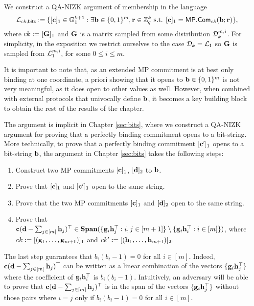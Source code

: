 We construct a QA-NIZK argument of membership in the language
$$
\mathcal{L}_{ck,\mathsf{bits}} := \{[\mathbf{c}]_1\in\mathbb{G}_1^{k+1} : \exists \mathbf{b}\in\{0,1\}^m,\mathbf{r}\in\mathbb{Z}_q^k \text{ s.t. } [\mathbf{c}]_1 = \mathsf{MP}.\mathsf{Com}_{ck}(\mathbf{b};\mathbf{r})\},
$$
where $ck:=[\mathbf{{G}}]_1$ and $\mathbf{{G}}$ is a matrix sampled from 
some distribution $\mathcal{D}_k^{m,i}$. For simplicity, in the exposition we restrict ourselves to the case $\mathcal{D}_k=\mathcal{L}_{1}$ so  $\mathbf{{G}}$ is sampled from $\mathcal{L}_1^{m,i}$, for some $0 \leq i \leq m$.

It is important to note that, as an extended MP commitment is at best only binding at one coordinate, a priori showing that it opens to $\mathbf{b} \in \{0,1\}^m$ is not very meaningful, as it does open to other values as well. However, when combined with external protocols that univocally define $\mathbf{b}$, it becomes a key building block to obtain the rest of the results of the chapter. 

The argument is implicit in Chapter \ref{sec:bits}, where we construct a QA-NIZK argument for proving that a perfectly binding commitment opens to a bit-string. More technically, to prove that a  perfectly binding commitment $[\mathbf{c}']_1$ opens to a bit-string $\mathbf{b}$, the argument in Chapter \ref{sec:bits} takes the following steps:
\begin{enumerate}
\item Construct two MP commitments $[\mathbf{c}]_1$, 
$[\mathbf{d}]_2$ to $\mathbf{b}$. 
\item Prove that $[\mathbf{c}]_1$ and $[\mathbf{c}']_1$ open to the same string. 
\item Prove that the two MP commitments $[\mathbf{c}]_1$ and $[\mathbf{d}]_2$ open to the same string.
\item Prove that $\mathbf{c}(\mathbf{d}-\sum_{j \in [m]}
\mathbf{h}_j)^\top\in\mathbf{Span}(\{\mathbf{g}_i\mathbf{h}_j^\top:i,j\in[m+1]\}\setminus\{\mathbf{g}_i\mathbf{h}_i^\top:i\in[m]\})$, where $ck:=[(\mathbf{g}_1,\ldots,\mathbf{g}_{m+1})]_1$ and $ck':=[(\mathbf{h}_1,\ldots,\mathbf{h}_{m+1})]_2$.
\end{enumerate}
The last step guarantees that 
$b_i(b_i-1)=0$ for all $i \in [m]$. Indeed, 
$\mathbf{c}(\mathbf{d}-\sum_{j \in [m]}
\mathbf{h}_j)^\top$ can be written as a linear combination of the vectors $\{\mathbf{g}_i\mathbf{h}_j^\top\}$ where the coefficient of $\mathbf{g}_i\mathbf{h}_i^{\top}$ is $b_i(b_i-1)$. Intuitively, an adversary will be able to prove that $\mathbf{c}(\mathbf{d}-\sum_{j \in [m]}
\mathbf{h}_j)^\top$ is in the span of the vectors  $\{\mathbf{g}_i\mathbf{h}_j^\top\}$ without those pairs where $i=j$ only if $b_i(b_i-1)=0$ for all $i \in [m]$. 


